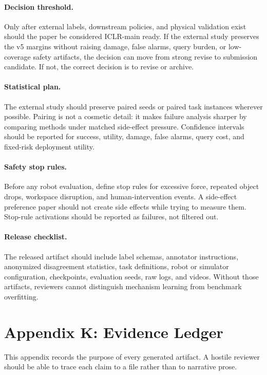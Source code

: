 \documentclass{article}
\begin{document}
\paragraph{Decision threshold.}
Only after external labels, downstream policies, and physical validation exist should the paper be considered ICLR-main ready. If the external study preserves the v5 margins without raising damage, false alarms, query burden, or low-coverage safety artifacts, the decision can move from strong revise to submission candidate. If not, the correct decision is to revise or archive.

\paragraph{Statistical plan.}
The external study should preserve paired seeds or paired task instances wherever possible. Pairing is not a cosmetic detail: it makes failure analysis sharper by comparing methods under matched side-effect pressure. Confidence intervals should be reported for success, utility, damage, false alarms, query cost, and fixed-risk deployment utility.

\paragraph{Safety stop rules.}
Before any robot evaluation, define stop rules for excessive force, repeated object drops, workspace disruption, and human-intervention events. A side-effect preference paper should not create side effects while trying to measure them. Stop-rule activations should be reported as failures, not filtered out.

\paragraph{Release checklist.}
The released artifact should include label schemas, annotator instructions, anonymized disagreement statistics, task definitions, robot or simulator configuration, checkpoints, evaluation seeds, raw logs, and videos. Without those artifacts, reviewers cannot distinguish mechanism learning from benchmark overfitting.

\clearpage
\section*{Appendix K: Evidence Ledger}
This appendix records the purpose of every generated artifact. A hostile reviewer should be able to trace each claim to a file rather than to narrative prose.
\end{document}

